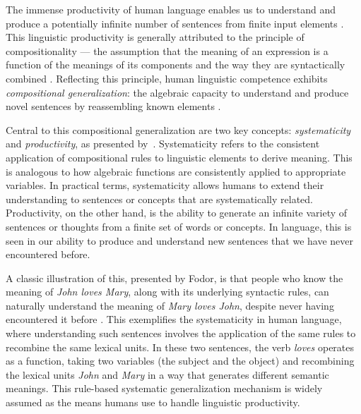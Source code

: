 The immense productivity of human language enables us to understand and produce a potentially infinite number of sentences from finite input elements \citep{chomsky1965aspects, hauser2002faculty}. This linguistic productivity is generally attributed to the principle of compositionality --- the assumption that the meaning of an expression is a function of the meanings of its components and the way they are syntactically combined \citep{frege_1892,partee1984compositionality}. Reflecting this principle, human linguistic competence exhibits \emph{compositional generalization}: the algebraic capacity to understand and produce novel sentences by reassembling known elements \citep{montague1974c}. 

Central to this compositional generalization are two key concepts: \textit{systematicity} and \textit{productivity}, as presented by~\cite{fodor1988connectionism}. Systematicity refers to the consistent application of compositional rules to linguistic elements to derive meaning. This is analogous to how algebraic functions are consistently applied to appropriate variables. In practical terms, systematicity allows humans to extend their understanding to sentences or concepts that are systematically related. Productivity, on the other hand, is the ability to generate an infinite variety of sentences or thoughts from a finite set of words or concepts. In language, this is seen in our ability to produce and understand new sentences that we have never encountered before. 

A classic illustration of this, presented by Fodor, is that people who know the meaning of \emph{John loves Mary}, along with its underlying syntactic rules, can naturally understand the meaning of \emph{Mary loves John}, despite never having encountered it before \citep{fodor1988connectionism}. This exemplifies the systematicity in human language, where understanding such sentences involves the application of the same rules to recombine the same lexical units. In these two sentences, the verb \textit{loves} operates as a function, taking two variables (the subject and the object) and recombining the lexical units \textit{John} and \textit{Mary} in a way that generates different semantic meanings. This rule-based systematic generalization mechanism is widely assumed as the means humans use to handle linguistic productivity. 


